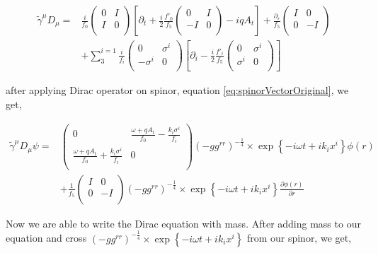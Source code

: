 \begin{align}
   \tilde{\gamma}^{\mu}D_{\mu} =& \frac{i}{f_0}\begin{pmatrix} 0 & I \\ I & 0 \\ \end{pmatrix} \left[\partial_{t} + \frac{i}{2}\frac{f'_0}{f_5}\begin{pmatrix} 0 & I \\ -I & 0 \\ \end{pmatrix} -iqA_{t}\right] + \frac{\partial_{r}}{f_5}\begin{pmatrix} I & 0 \\ 0 & -I \\ \end{pmatrix} \nonumber\\
   & + \sum\limits_{3}^{i=1}\frac{i}{f_i}\begin{pmatrix} 0 & \sigma^i \\ -\sigma^i & 0 \\ \end{pmatrix} \left[\partial_{i} - \frac{i}{2}\frac{f'_i}{f_5}\begin{pmatrix} 0 & \sigma^i \\ \sigma^i & 0 \\ \end{pmatrix} \right]
\end{align}

after applying Dirac operator on spinor, equation \ref{eq:spinorVectorOriginal}, we get,

\begin{align}
   \tilde{\gamma}^{\mu}D_{\mu}\psi =& \begin{pmatrix} 0 & \frac{\omega + qA_t}{f_0} - \frac{k_i\sigma^i}{f_i} \\ \frac{\omega + qA_t}{f_0} + \frac{k_i\sigma^i}{f_i} & 0 \\ \end{pmatrix} (-gg^{rr})^{-\frac{1}{4}}\times\exp\left\{-i\omega t +ik_ix^i\right\}\phi(r)  \nonumber\\
   & + \frac{1}{f_5} \begin{pmatrix} I & 0 \\ 0 & -I \\ \end{pmatrix} (-gg^{rr})^{-\frac{1}{4}}\times\exp\left\{-i\omega t +ik_ix^i\right\}\frac{\partial\phi(r)}{\partial r}
\end{align}

Now we are able to write the Dirac equation with mass. After adding mass to our equation and cross $(-gg^{rr})^{-\frac{1}{4}}\times\exp\left\{-i\omega t +ik_ix^i\right\}$ from our spinor, we get,

